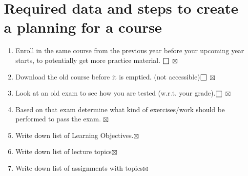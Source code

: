 \section*{Required data and steps to create a planning for a course}\label{sec:t1_neck}
\begin{enumerate}
    \setcounter{enumi}{0} 
    \item Enroll in the same course from the previous year before your upcoming year starts, to potentially get more practice material.  $\msquare$ $\boxtimes$
    \item Download the old course before it is emptied. (not accessible)$\msquare$ $\boxtimes$
    \item Look at an old exam to see how you are tested (w.r.t. your grade).$\msquare$ $\boxtimes$
    \item Based on that exam determine what kind of exercises/work should be performed to pass the exam. $\boxtimes$
    \item Write down list of Learning Objectives.$\boxtimes$
    \item Write down list of lecture topics$\boxtimes$
    \item Write down list of assignments with topics$\boxtimes$
    

\end{enumerate}
